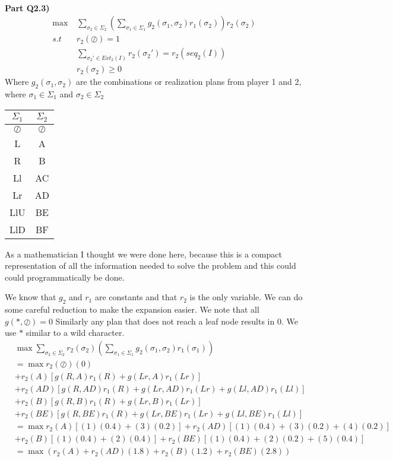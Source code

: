 \documentclass[12pt,letter]{article}
\newcommand{\ppart}[1]{\vspace{2mm}\large\textbf{\\Part {#1})\vspace{2mm}}\normalsize\\}
\begin{document}
\ppart{Q2.3}
\begin{align*}
    \max &\sum\limits_{\sigma_2\in\Sigma_2}\left(\sum\limits_{\sigma_1\in\Sigma_1}g_2(\sigma_1,\sigma_2)r_1(\sigma_2)\right)r_2(\sigma_2)\\
    s.t \hspace{1em}& r_2(\oslash) = 1\\
        & \sum\limits_{\sigma_2'\in Ext_2(I)}r_2(\sigma_2') = r_2(seq_2(I))\\
        & r_2(\sigma_2)\geq 0
\end{align*}
Where $g_2(\sigma_1,\sigma_2)$ are the combinations or realization plans from
player 1 and 2, where $\sigma_1\in\Sigma_1$ and $\sigma_2\in\Sigma_2$
\begin{table}[h]
    \centering
    \begin{tabular}{c|c}
        \hline
        $\Sigma_1$ & $\Sigma_2$\\
        \hline
        $\oslash$ & $\oslash$ \\
        L & A\\
        R & B\\
        Ll & AC\\
        Lr & AD\\
        LlU & BE\\
        LlD & BF\\
    \end{tabular}
\end{table}

As a mathematician I thought we were done here, because this is a compact 
representation of all the information needed to solve the problem and this could
could programmatically be done.

We know that $g_2$ and $r_1$ are constants and that $r_2$ is the only variable.
We can do some careful reduction to make the expansion easier. We note that
all $g(*,\oslash)=0$ Similarly any plan that does not reach a leaf node results
in $0$. We use $*$ similar to a wild character. 
\begin{align*}
    &\max \sum\limits_{\sigma_2\in\Sigma_2}r_2(\sigma_2)\left(\sum\limits_{\sigma_1\in\Sigma_1}g_2(\sigma_1,\sigma_2)r_1(\sigma_1)\right)\\
    &=\max r_2(\oslash)(0)\\
    &+r_2(A)[g(R,A)r_1(R) + g(Lr,A)r_1(Lr)]\\
    &+r_2(AD)[g(R,AD)r_1(R) + g(Lr,AD)r_1(Lr) + g(Ll,AD)r_1(Ll)]\\
    &+r_2(B)[g(R,B)r_1(R) + g(Lr,B)r_1(Lr)]\\
    &+r_2(BE)[g(R,BE)r_1(R) + g(Lr,BE)r_1(Lr) + g(Ll,BE)r_1(Ll)]\\
    &=\max r_2(A)[(1)(0.4) + (3)(0.2)] + r_2(AD)[(1)(0.4) + (3)(0.2) + (4)(0.2)]\\
    &+r_2(B)[(1)(0.4) + (2)(0.4)] + r_2(BE)[(1)(0.4) + (2)(0.2) + (5)(0.4)]\\
    &=\max \left(r_2(A) + r_2(AD)(1.8) + r_2(B)(1.2) + r_2(BE)(2.8)\right)
\end{align*}
\end{document}
